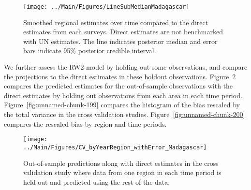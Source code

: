 \documentclass[12pt]{article}\usepackage[]{graphicx}\usepackage[]{color}
\newenvironment{knitrout}{}{} %
\begin{document}
\begin{knitrout}
\color{fgcolor}\begin{figure}[bht]

{\centering \texttt{[image: ../Main/Figures/LineSubMedianMadagascar]} 

}

\caption[Smoothed regional estimates over time compared to the direct estimates from each surveys]{Smoothed regional estimates over time compared to the direct estimates from each surveys. Direct estimates are not benchmarked with UN estimates. The line indicates posterior median and error bars indicate 95\% posterior credible interval.}\label{fig:unnamed-chunk-197}
\end{figure}


\end{knitrout}
We further assess the RW2 model by holding out some observations, and compare the projections to the direct estimates in these holdout observations. Figure~\ref{fig:unnamed-chunk-198} compares the predicted estimates for the out-of-sample observations  with the direct estimates by holding out observations from each area in each time period.  Figure~\ref{fig:unnamed-chunk-199} compares the histogram of the bias rescaled by the total variance in the cross validation studies. Figure~\ref{fig:unnamed-chunk-200} compares the rescaled bias by region and time periods.



 
\begin{knitrout}
\color{fgcolor}\begin{figure}[bht]

{\centering \texttt{[image: ../Main/Figures/CV\_byYearRegion\_withError\_Madagascar]} 

}

\caption[Out-of-sample predictions along with direct estimates in the cross validation study where data from one region in each time period is held out and predicted using the rest of the data]{Out-of-sample predictions along with direct estimates in the cross validation study where data from one region in each time period is held out and predicted using the rest of the data.}\label{fig:unnamed-chunk-198}
\end{figure}


\end{knitrout}
\end{document}
